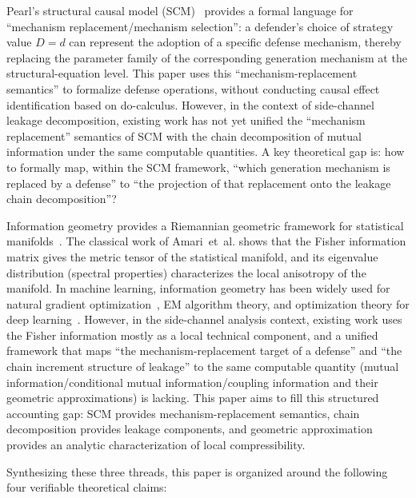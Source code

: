 \documentclass[lettersize,journal]{IEEEtran}
\begin{document}
Pearl's structural causal model (SCM)~\cite{pearl2009causality} provides
a formal language for ``mechanism replacement/mechanism selection'': a
defender's choice of strategy value $D=d$ can represent the adoption of a
specific defense mechanism, thereby replacing the parameter family of the
corresponding generation mechanism at the structural-equation level.
This paper uses this ``mechanism-replacement semantics'' to formalize
defense operations, without conducting causal effect identification based
on do-calculus.
However, in the context of side-channel leakage decomposition, existing
work has not yet unified the ``mechanism replacement'' semantics of SCM
with the chain decomposition of mutual information under the same
computable quantities.
A key theoretical gap is: how to formally map, within the SCM framework,
``which generation mechanism is replaced by a defense'' to ``the projection
of that replacement onto the leakage chain decomposition''?

Information geometry provides a Riemannian geometric framework for
statistical manifolds~\cite{amari2016information}.
The classical work of Amari~et~al. shows that the Fisher information
matrix gives the metric tensor of the statistical manifold, and its
eigenvalue distribution (spectral properties) characterizes the local
anisotropy of the manifold.
In machine learning, information geometry has been widely used for natural
gradient optimization~\cite{amari1998natural}, EM algorithm theory, and
optimization theory for deep learning~\cite{amari1995information}.
However, in the side-channel analysis context, existing work uses the
Fisher information mostly as a local technical component, and a unified
framework that maps ``the mechanism-replacement target of a defense'' and
``the chain increment structure of leakage'' to the same computable quantity
(mutual information/conditional mutual information/coupling information and
their geometric approximations) is lacking.
This paper aims to fill this structured accounting gap: SCM provides
mechanism-replacement semantics, chain decomposition provides leakage
components, and geometric approximation provides an analytic characterization
of local compressibility.

Synthesizing these three threads, this paper is organized around the
following four verifiable theoretical claims:
\end{document}
